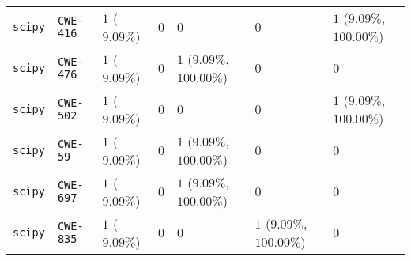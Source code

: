 \begin{table}
\begin{tabular}{lllllll}
\texttt{scipy} & \texttt{CWE-416} & $1$ ($9.09\%$) & $0$ & $0$ & $0$ & $1$ ($9.09\%$, $100.00\%$) \\
\texttt{scipy} & \texttt{CWE-476} & $1$ ($9.09\%$) & $0$ & $1$ ($9.09\%$, $100.00\%$) & $0$ & $0$ \\
\texttt{scipy} & \texttt{CWE-502} & $1$ ($9.09\%$) & $0$ & $0$ & $0$ & $1$ ($9.09\%$, $100.00\%$) \\
\texttt{scipy} & \texttt{CWE-59} & $1$ ($9.09\%$) & $0$ & $1$ ($9.09\%$, $100.00\%$) & $0$ & $0$ \\
\texttt{scipy} & \texttt{CWE-697} & $1$ ($9.09\%$) & $0$ & $1$ ($9.09\%$, $100.00\%$) & $0$ & $0$ \\
\texttt{scipy} & \texttt{CWE-835} & $1$ ($9.09\%$) & $0$ & $0$ & $1$ ($9.09\%$, $100.00\%$) & $0$ \\
\bottomrule
\end{tabular}
\end{table}
